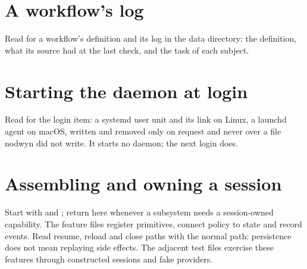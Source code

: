 
\chapter{A workflow's log}

Read  for a workflow's definition and its log in the data directory: the definition, what its source had at the last check, and the task of each subject.


\chapter{Starting the daemon at login}

Read  for the login item: a systemd user unit and its link on Linux, a launchd agent on macOS, written and removed only on request and never over a file nodwyn did not write. It starts no daemon; the next login does.


\chapter{Assembling and owning a session}

Start with  and ; return here whenever a subsystem needs a session-owned capability. The feature files register primitives, connect policy to state and record events. Read resume, reload and close paths with the normal path: persistence does not mean replaying side effects. The adjacent test files exercise these features through constructed sessions and fake providers.









